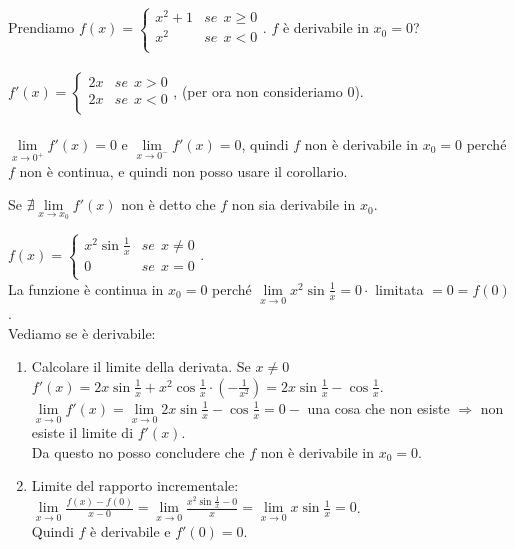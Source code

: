 \begin{example}
Prendiamo $f(x) = \begin{cases}x^2 + 1 & se \:\: x \geq 0\\ x^2 & se \:\: x < 0\\\end{cases}$. $f$ è derivabile in $x_0 = 0$?\\\\
$f'(x) = \begin{cases}2x & se \:\: x > 0\\ 2x & se \:\: x < 0\\\end{cases}$, (per ora non consideriamo 0).\\\\
$\lim\limits_{x\to 0^+}f'(x) = 0$ e $\lim\limits_{x\to 0^-}f'(x) = 0$, quindi $f$ non è derivabile in $x_0 = 0$ perché $f$ non è continua, e quindi non posso usare il corollario.
\end{example}

\begin{observation}
Se $\nexists \lim\limits_{x\to x_0}f'(x)$ non è detto che $f$ non sia derivabile in $x_0$.
\end{observation}

\begin{example}
$f(x) = \begin{cases}x^2\sin{\frac{1}{x}} & se \:\: x \neq 0\\ 0 & se \:\: x = 0\\\end{cases}$.\\
La funzione è continua in $x_0 = 0$ perché $\lim\limits_{x\to 0}x^2\sin{\frac{1}{x}} = 0 \cdot$ limitata $= 0 = f(0)$.\\
Vediamo se è derivabile:
\begin{enumerate}
    \item Calcolare il limite della derivata. Se $x \neq 0$ $f'(x) = 2x\sin{\frac{1}{x}} + x^2\cos{\frac{1}{x}} \cdot (-\frac{1}{x^2}) = 2x\sin{\frac{1}{x}} - \cos{\frac{1}{x}}$.\\
    $\lim\limits_{x\to 0}f'(x) = \lim\limits_{x\to 0}2x\sin{\frac{1}{x}} - \cos{\frac{1}{x}} = 0 - $ una cosa che non esiste $\Longrightarrow$ non esiste il limite di $f'(x)$. \\
    Da questo no posso concludere che $f$ non è derivabile in $x_0 = 0$.
    \item Limite del rapporto incrementale: $\lim\limits_{x\to 0}\frac{f(x) - f(0)}{x - 0} = \lim\limits_{x\to 0}\frac{x^2\sin{\frac{1}{x}} - 0}{x} = \lim\limits_{x\to 0}x\sin{\frac{1}{x}} = 0$. \\
    Quindi $f$ è derivabile e $f'(0) = 0$.
\end{enumerate}
\end{example}

